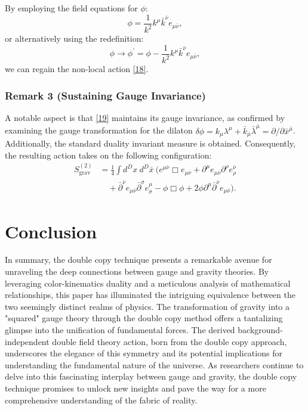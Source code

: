 \documentclass[13pt]{article}
\begin{document}
By employing the field equations for $\phi$:
\begin{equation}
\phi = \frac{1}{k^2} k^{\mu}\bar{k}^{\bar{\nu}}e_{\mu \bar{\nu}}, \tag{20}
\end{equation}
or alternatively using the redefinition:
\begin{equation}
\phi \rightarrow \phi^{\prime} = \phi - \frac{1}{k^2} k^{\mu}\bar{k}^{\bar{\nu}}e_{\mu \bar{\nu}}, \tag{21}
\end{equation}
we can regain the non-local action \eqref{18}.

\subsubsection*{Remark 3 (Sustaining Gauge Invariance)}
A notable aspect is that \eqref{19} maintains its gauge invariance, as confirmed by examining the gauge transformation for the dilaton $\delta \phi = k_{\mu}\lambda^{\mu} + \bar{k}_{\bar{\mu}}\bar{\lambda}^{\bar{\mu}} = \partial / \partial \bar{x}^{\bar{\mu}}$. Additionally, the standard duality invariant measure is obtained. Consequently, the resulting action takes on the following configuration:
\begin{align}
S_{\text{grav}}^{(2)} &= \frac{1}{4} \int d^D x \ d^D \bar{x} \ (e^{\mu \bar{\nu}}\Box e_{\mu \bar{\nu}} + \partial^{\mu}e_{\mu \bar{\nu}}\partial^{\rho}e_{\rho}^{\bar{\nu}} \nonumber \\
&\quad + \bar{\partial}^{\bar{\nu}}e_{\mu \bar{\nu}}\bar{\partial}^{\bar{\sigma}}e^{\mu}_{\bar{\sigma}} - \phi \Box \phi + 2\phi \partial^{\mu}\bar{\partial}^{\bar{\nu}}e_{\mu \bar{\nu}}). \tag{22}
\end{align}





\section{Conclusion}
In summary, the double copy technique presents a remarkable avenue for unraveling the deep connections between gauge and gravity theories. By leveraging color-kinematics duality and a meticulous analysis of mathematical relationships, this paper has illuminated the intriguing equivalence between the two seemingly distinct realms of physics. The transformation of gravity into a "squared" gauge theory through the double copy method offers a tantalizing glimpse into the unification of fundamental forces. The derived background-independent double field theory action, born from the double copy approach, underscores the elegance of this symmetry and its potential implications for understanding the fundamental nature of the universe. As researchers continue to delve into this fascinating interplay between gauge and gravity, the double copy technique promises to unlock new insights and pave the way for a more comprehensive understanding of the fabric of reality.

\newpage


\end{document}
